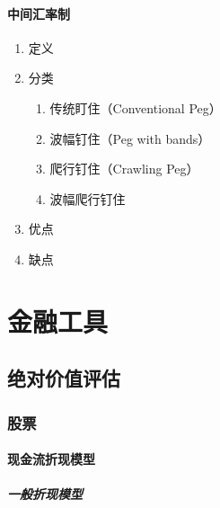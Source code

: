 \documentclass[12pt]{book}
\begin{document}
\subsubsection{中间汇率制}


\begin{enumerate}[1.]
    \item 定义
    \item 分类
          \begin{enumerate}[(1)]
              \item 传统盯住（Conventional Peg）
              \item 波幅钉住（Peg with bands）
              \item 爬行钉住（Crawling Peg）
              \item 波幅爬行钉住
          \end{enumerate}
    \item 优点
    \item 缺点
\end{enumerate}











\chapter{金融工具}













\section{绝对价值评估}




\subsection{股票}




\subsubsection{现金流折现模型}



\paragraph{一般折现模型}
\end{document}
